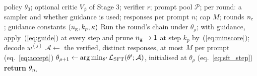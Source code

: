 \begin{algorithm}[t]
\caption{Amortisation loop (with optional critic-guided sampling)}
\label{alg:loop}
\small
\begin{algorithmic}[1]
\REQUIRE policy $\theta_0$; optional critic $V_\phi$ of Stage 3; verifier $r$; prompt pool $\mathcal P$; per round: a sampler and whether guidance is used; responses per prompt $n$; cap $M$; rounds $n_{\rm r}$; guidance constants $(n_{\rm g},k_p,\kappa)$
    \STATE Run the round's chain under $\theta_\rho$; with guidance, apply~(\ref{eq:guide}) at every step and prune $n_{\rm g}\to1$ at step $k_p$ by~(\ref{eq:minscore}); decode $w^{(j)}$
  \ENDFOR
  \STATE $\mathcal A\leftarrow$ the verified, distinct responses, at most $M$ per prompt \hfill (eq.~\ref{eq:accept})
  \STATE $\theta_{\rho+1}\leftarrow\arg\min_{\theta'}\mathcal L_{\rm SFT}(\theta';\mathcal A)$, initialised at $\theta_\rho$ \hfill (eq.~\ref{eq:sft_step})
\ENDFOR
\STATE \textbf{return} $\theta_{n_{\rm r}}$
\end{algorithmic}
\end{algorithm}
